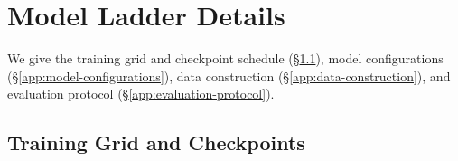%
%
\providecommand{\citeneeded}[1]{\textcolor{red}{[CITE: #1]}}
\providecommand{\checknum}[1]{\textcolor{orange}{#1}}


\section{Model Ladder Details}
\label{app:methodology}

We give the training grid and checkpoint schedule (\S\ref{app:training-grid}), model configurations (\S\ref{app:model-configurations}), data construction (\S\ref{app:data-construction}), and evaluation protocol (\S\ref{app:evaluation-protocol}).


\subsection{Training Grid and Checkpoints}
\label{app:training-grid}

